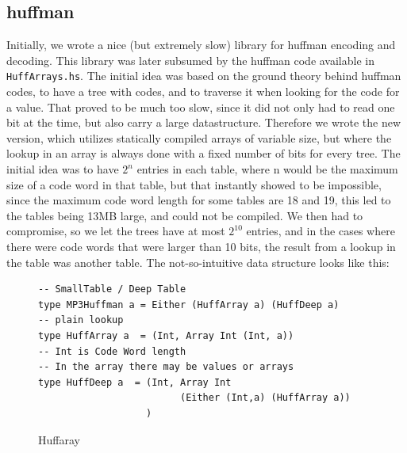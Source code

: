 \documentclass[a4paper,12pt]{article}
\begin{document}
    \subsection{huffman}
    \label{sec:huffman}
        Initially, we wrote a nice (but extremely slow) library for huffman
        encoding and decoding. This library was later subsumed by the huffman
        code available in \texttt{HuffArrays.hs}. The initial idea was based on the
        ground theory behind huffman codes, to have a tree with codes, and to
        traverse it when looking for the code for a value. That proved to be
        much too slow, since it did not only had to read one bit at the time,
        but also carry a large datastructure. Therefore we wrote the new
        version, which utilizes statically compiled arrays of variable size, but
        where the lookup in an array is always done with a fixed number of bits
        for every tree. The initial idea was to have $2^n$ entries in each
        table, where n would be the maximum size of a code word in that table,
        but that instantly showed to be impossible, since the maximum code word
        length for some tables are 18 and 19, this led to the tables being 13MB
        large, and could not be compiled. We then had to compromise, so we let
        the trees have at most $2^{10}$ entries, and in the cases where there were
        code words that were larger than 10 bits, the result from a lookup in
        the table was another table. The not-so-intuitive data structure looks
        like this:
\begin{figure}[h]
  \begin{center}
        \begin{lstlisting}
-- SmallTable / Deep Table
type MP3Huffman a = Either (HuffArray a) (HuffDeep a)
-- plain lookup
type HuffArray a  = (Int, Array Int (Int, a))
-- Int is Code Word length
-- In the array there may be values or arrays
type HuffDeep a  = (Int, Array Int
                         (Either (Int,a) (HuffArray a))
                   )
        \end{lstlisting}
    \caption{Huffaray}\label{fig:huffarraycode}
  \end{center}
\end{figure}
\end{document}
